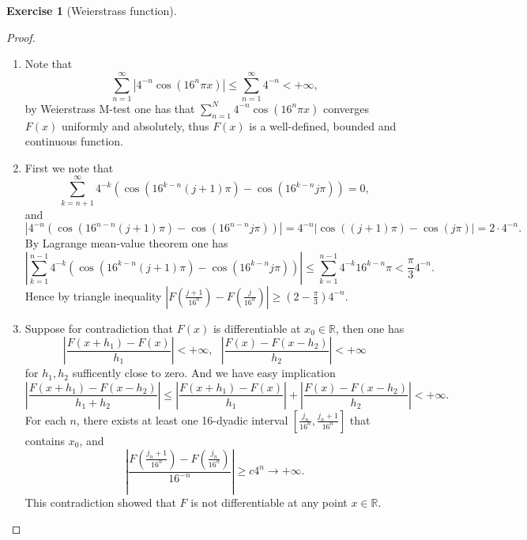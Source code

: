 \documentclass[a4paper]{article}
\newtheorem{ex}{Exercise}[subsection]
\begin{document}
\begin{ex}[Weierstrass function]\end{ex}\begin{proof}\ 
\begin{enumerate}[label = (\roman*)]
    \item Note that $$\sum_{n = 1}^\infty |4^{-n}\cos(16^n\pi x)| \leq \sum_{n = 1}^\infty 4^{-n} < +\infty,$$ 
    by Weierstrass M-test one has that $\sum_{n = 1}^N 4^{-n}\cos(16^n\pi x)$ converges $F(x)$ uniformly and 
    absolutely, thus $F(x)$ is a well-defined, bounded and continuous function.
    \item First we note that $$
    \sum_{k = n + 1}^\infty 4^{-k}(\cos(16^{k - n}(j + 1)\pi) - \cos(16^{k - n}j\pi)) = 0,
    $$and $$
    |4^{-n}(\cos(16^{n - n}(j + 1)\pi) - \cos(16^{n - n}j\pi))| = 4^{-n}|\cos((j + 1)\pi) - \cos(j\pi)| = 2\cdot 4^{-n}.
    $$By Lagrange mean-value theorem one has $$
    |\sum_{k = 1}^{n - 1} 4^{-k}(\cos(16^{k - n}(j + 1)\pi) - \cos(16^{k - n}j\pi))| \leq \sum_{k = 1}^{n - 1}
    4^{-k}16^{k - n}\pi < \frac{\pi}{3}4^{-n}.
    $$Hence by triangle inequality $|F(\frac{j + 1}{16^n}) - F(\frac{j}{16^n})| \geq (2 - \frac{\pi}{3})4^{-n}$.
    \item Suppose for contradiction that $F(x)$ is differentiable at $x_0 \in \mathbb{R}$, then one has $$
    |\frac{F(x + h_1) - F(x)}{h_1}| < +\infty,\ \ \ |\frac{F(x) - F(x - h_2)}{h_2}| < +\infty
    $$for $h_1, h_2$ sufficently close to zero. And we have easy implication$$
    |\frac{F(x + h_1) - F(x - h_2)}{h_1 + h_2}| \leq |\frac{F(x + h_1) - F(x)}{h_1}| + |\frac{F(x) - F(x - h_2)}{h_2}| < +\infty.
    $$For each $n$, there exists at least one 16-dyadic interval $[\frac{j_n}{16^n}, \frac{j_n + 1}{16^n}]$ that 
    contains $x_0$, and $$
    |\frac{F(\frac{j_n + 1}{16^n}) - F(\frac{j_n}{16^n})}{16^{-n}}| \geq c4^n \to +\infty.
    $$This contradiction showed that $F$ is not differentiable at any point $x \in \mathbb{R}$.%
\end{enumerate}
\end{proof}
\end{document}
